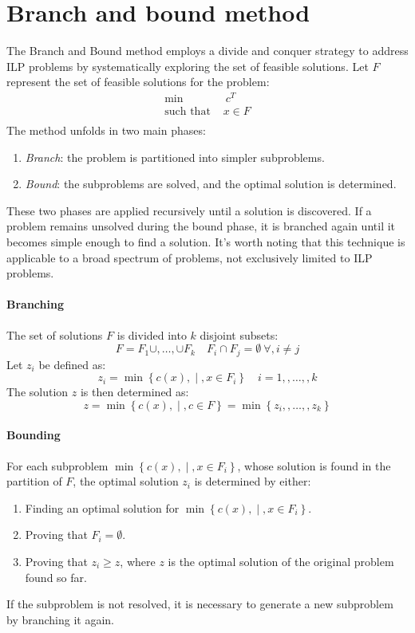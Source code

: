 \section{Branch and bound method}
The Branch and Bound method employs a divide and conquer strategy to address ILP problems by systematically exploring the set of feasible solutions.
Let $F$ represent the set of feasible solutions for the problem:
\begin{align*}
    \min                    \:&\: c^T     \\
    \text{such that }   &   x \in F \\
\end{align*}
The method unfolds in two main phases:
\begin{enumerate}
    \item \textit{Branch}: the problem is partitioned into simpler subproblems.
    \item \textit{Bound}: the subproblems are solved, and the optimal solution is determined.
\end{enumerate}
These two phases are applied recursively until a solution is discovered. 
If a problem remains unsolved during the bound phase, it is branched again until it becomes simple enough to find a solution. 
It's worth noting that this technique is applicable to a broad spectrum of problems, not exclusively limited to ILP problems.

\paragraph*{Branching}
The set of solutions $F$ is divided into $k$ disjoint subsets:
\[ F = F_1 \cup,  \ldots,  \cup F_k \quad F_i \cap F_j = \emptyset \: \forall,  i \neq j \]
Let $z_i$ be defined as:
\[ z_i = \min\left\{ c(x), \middle\vert, x \in F_i \right\} \quad i = 1,,  \ldots,  , k \]
The solution $z$ is then determined as:
\[ z = \min\left\{ c(x), \middle\vert, c \in F \right\} = \min\left\{ z_i,,  \ldots, , z_k \right\} \]

\paragraph*{Bounding}
For each subproblem $\min\left\{ c(x), \middle\vert, x \in F_i \right\}$, whose solution is found in the partition of $F$, the optimal solution $z_i$ is determined by either:
\begin{enumerate}
    \item Finding an optimal solution for $\min\left\{ c(x), \middle\vert, x \in F_i \right\}$.
    \item Proving that $F_i = \emptyset$.
    \item Proving that $z_i \geq z$, where $z$ is the optimal solution of the original problem found so far.
\end{enumerate}
If the subproblem is not resolved, it is necessary to generate a new subproblem by branching it again.

